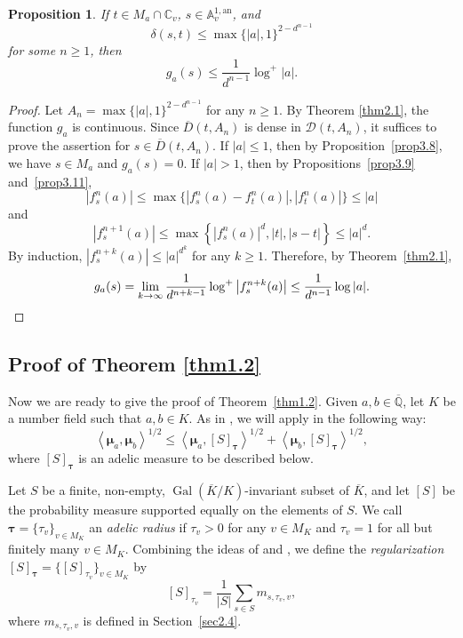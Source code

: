 \documentclass[11pt]{amsart}
\numberwithin{equation}{section}
\theoremstyle{plain}
\newtheorem{prop}[thm]{Proposition}
\theoremstyle{definition}
\theoremstyle{remark}
\DeclareMathOperator{\Gal}{Gal}
\newcommand{\A}{\mathbb A}
\newcommand{\C}{\mathbb C}
\newcommand{\Q}{\mathbb Q}
\newcommand{\an}{\mathrm{an}}
\renewcommand{\bar}{\overline}
\begin{document}
\begin{prop}
\label{prop3.12}If $t\in M_{a}\cap\C_{v}$, $s\in\A_{v}^{1,\an}$,
and
\[
\delta(s,t)\leq\max\{|a|,1\}^{2-d^{n-1}}
\]
for some $n\geq1$, then
\[
g_{a}(s)\leq\frac{1}{d^{n-1}}\log^{+}|a|.
\]
\end{prop}

\begin{proof}
Let $A_{n}=\max\{|a|,1\}^{2-d^{n-1}}$ for any $n\geq1$. By Theorem
\ref{thm2.1}, the function $g_{a}$ is continuous. Since $\overline{D}(t,A_{n})$
is dense in $\mathcal{D}(t,A_{n})$, it suffices to prove the assertion
for $s\in\overline{D}(t,A_{n})$. If $|a|\leq1$, then by Proposition~\ref{prop3.8}, we have $s\in M_{a}$ and $g_{a}(s)=0$. If $|a|>1$, then
by Propositions~\ref{prop3.9} and~\ref{prop3.11},
\[
|f_{s}^{n}(a)|\leq\max\{|f_{s}^{n}(a)-f_{t}^{n}(a)|,|f_{t}^{n}(a)|\}\leq|a|
\]
and
\[
\left|f_{s}^{n+1}(a)\right|\leq\max\left\{|f_{s}^{n}(a)|^{d},|t|,|s-t|\right\}\leq|a|^{d}.
\]
By induction, $|f_{s}^{n+k}(a)|\leq|a|^{d^{k}}$ for any $k\geq1$.
Therefore, by Theorem~\ref{thm2.1},
\[
g_{a}(s)=\lim_{k\to\infty}\frac{1}{d^{n+k-1}}\log^{+}\left|f_{s}^{n+k}(a)\right|\leq\frac{1}{d^{n-1}}\log|a|.\qedhere
\]
\end{proof}

\subsection{Proof of Theorem \texorpdfstring{\ref{thm1.2}}{1.2}}\label{sec3.3}

Now we are ready to give the proof of Theorem~\ref{thm1.2}. Given
$a,b\in\bar{\Q}$, let $K$ be a number field such that $a,b\in K$.
As in \cite[Section 9]{DKY2}, we will apply \cite[Theorem 1]{Fi} in
the following way:
\[
\left\langle \boldsymbol{\mu}_{a},\boldsymbol{\mu}_{b}\right\rangle ^{1/2}\leq\left\langle \boldsymbol{\mu}_{a},[S]_{\boldsymbol{\tau}}\right\rangle ^{1/2}+\left\langle \boldsymbol{\mu}_{b},[S]_{\boldsymbol{\tau}}\right\rangle ^{1/2},
\]
where $[S]_{\boldsymbol{\tau}}$ is an adelic measure to be described
below.

Let $S$ be a finite, non-empty, $\Gal(\bar{K}/K)$-invariant
subset of $\bar{K}$, and let $[S]$ be the probability measure supported
equally on the elements of $S$. We call $\boldsymbol{\tau}=\{\tau_{v}\}_{v\in M_{K}}$
an \textit{adelic radius} if $\tau_{v}>0$ for any $v\in M_{K}$
and $\tau_{v}=1$ for all but finitely many $v\in M_{K}$. Combining
the ideas of \cite[Section 4.6]{FRL} and \cite[Section 2.1]{FP},
we define the \textit{regularization} $[S]_{\boldsymbol{\tau}}=\{[S]_{\tau_{v}}\}_{v\in M_{K}}$
by
\[
[S]_{\tau_{v}}=\frac{1}{|S|}\sum_{s\in S}m_{s,\tau_{v},v},
\]
where $m_{s,\tau_{v},v}$ is defined in Section~\ref{sec2.4}.
\end{document}
